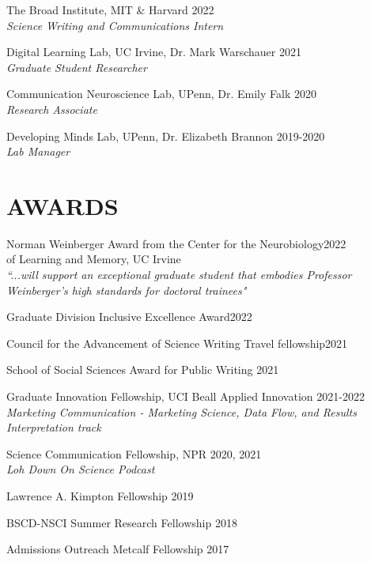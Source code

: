 \documentclass[margin, 10pt]{res} %
\begin{document}
\begin{resume}
{The Broad Institute, MIT \& Harvard} \hfill 2022 \\
{\sl Science Writing and Communications Intern}

{Digital Learning Lab, UC Irvine, Dr. Mark Warschauer} \hfill 2021 \\
{\sl Graduate Student Researcher}

{Communication Neuroscience Lab, UPenn, Dr. Emily Falk} \hfill 2020 \\
{\sl Research Associate}

{Developing Minds Lab, UPenn, Dr. Elizabeth Brannon} \hfill 2019-2020 \\
{\sl Lab Manager}


 
\section{AWARDS}
{Norman Weinberger Award from the Center for the Neurobiology}\hfill 2022\\
{of Learning and Memory, UC Irvine}\\
{\sl ``...will support an exceptional graduate student that embodies Professor Weinberger's high standards for doctoral trainees"}

{Graduate Division Inclusive Excellence Award}\hfill 2022

{Council for the Advancement of Science Writing Travel fellowship}\hfill 2021

{School of Social Sciences Award for Public Writing} \hfill 2021

{Graduate Innovation Fellowship, UCI Beall Applied Innovation} \hfill 2021-2022 \\
{\sl Marketing Communication - Marketing
Science, Data Flow, and Results \\Interpretation track}

{Science Communication Fellowship, NPR} \hfill 2020, 2021 \\
{\sl Loh Down On Science Podcast}

{Lawrence A. Kimpton Fellowship} \hfill 2019 

{BSCD-NSCI Summer Research Fellowship} \hfill 2018 

{Admissions Outreach Metcalf Fellowship} \hfill 2017 

 

\end{resume}
\end{document}
